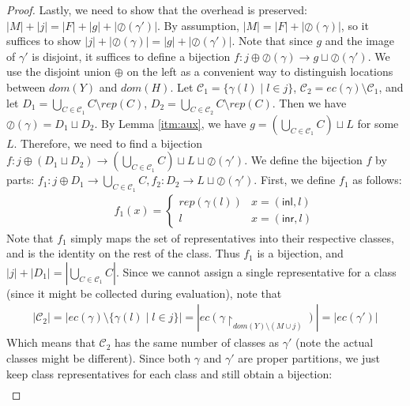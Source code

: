 \documentclass{easychair}
\newcommand{\ms}[1]{\ensuremath{\mathsf{#1}}}
\newcommand{\oh}[1]{\oslash(#1)}
\theoremstyle{definition}
\begin{document}
\begin{proof}
  Lastly, we need to show that the overhead is preserved: 
  $|M| + |j| = |F| + | g| + |\oh{\gamma'}|$.
	By assumption, $|M| = |F| + |\oh{\gamma}|$, so it suffices to show 
        $|j| + |\oh{\gamma}| = |g| + |\oh{\gamma'}|$. Note that since
        $g$ and the image of $\gamma'$ is disjoint, it suffices to define a bijection 
        $f : j \oplus \oh{\gamma} \to g \sqcup \oh{\gamma'}$. We use the disjoint union
        $\oplus$ on the left as a convenient way to distinguish locations between
        $dom(Y)$ and $dom(H)$. 
	Let $\mathcal{C}_1 = \{\gamma(l) \mid l \in j\}$, 
	$\mathcal{C}_2 = ec(\gamma) \setminus \mathcal{C}_1$, and
        let $D_1 = \bigcup_{C  \in \mathcal{C}_1} C \setminus rep(C)$,  
		$D_2 = \bigcup_{C  \in \mathcal{C}_2} C \setminus rep(C)$.
                Then we have $\oh{\gamma} = D_1 \sqcup D_2$.
                By Lemma \ref{itm:aux}, we have $g = (\bigcup_{C \in \mathcal{C}_1} C) \sqcup L $
                for some $L$. Therefore, we need to find a bijection
                $f : j \oplus (D_1 \sqcup D_2) \to (\bigcup_{C \in \mathcal{C}_1} C) \sqcup L
                \sqcup \oh{\gamma'}$. 
		We define the bijection $f$ by parts: 
		$f_1 : j \oplus D_1 \to \bigcup_{C \in \mathcal{C}_1} C,
                f_2 : D_2 \to L \sqcup \oh{\gamma'}$. First, we define $f_1$ as follows:
  \begin{align*}
		&\quad f_1(x) =  
		\begin{cases}
			rep(\gamma(l)) &x = (\ms{inl},l)\\
			l &x = (\ms{inr},l)
		\end{cases}
  \end{align*}
  Note that $f_1$ simply maps the set of representatives into their respective classes,
  and is the identity on the rest of the class. Thus $f_1$ is a bijection, and $|j| + |D_1| = 
  |\bigcup_{C \in \mathcal{C}_1} C|$. Since we cannot assign a single representative for a
  class (since it might be collected during evaluation),
    note that
  \begin{align*}
    |\mathcal{C}_2| = |ec(\gamma) \setminus \{\gamma(l) \mid l \in j\}|
    =|ec(\gamma \restriction_{dom(Y) \setminus (M \cup j)})|
    = |ec(\gamma')|
  \end{align*}
		Which means that $\mathcal{C}_2$  has the same number of classes as $\gamma'$
		(note the actual classes might be different). 
		Since both $\gamma$ and $\gamma'$  are proper partitions, we just keep class
    representatives for each class and still obtain a bijection:
    \begin{align*}

\end{align*}
\end{proof}
\end{document}
